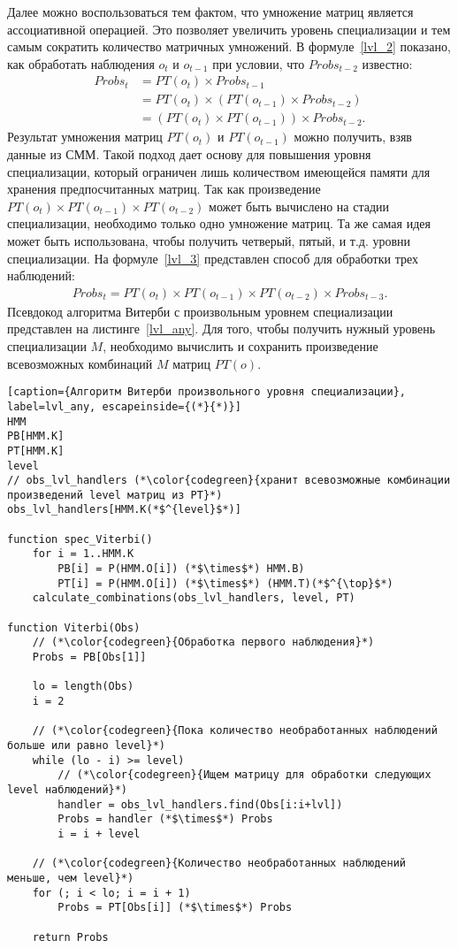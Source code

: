 Далее можно воспользоваться тем фактом, что умножение матриц 
является ассоциативной операцией.
Это позволяет увеличить уровень специализации и тем самым 
сократить количество матричных умножений.
В формуле~\ref{lvl_2} показано, как обработать наблюдения $o_{t}$ и $o_{t-1}$ при условии, 
что $Probs_{t-2}$ известно:
\begin{align}
  \mathit{Probs}_{t} &= \mathit{PT}(\mathit{o}_{t}) \times \mathit{Probs}_{t-1}\nonumber\\
  &= \mathit{PT}(\mathit{o}_{t}) \times (\mathit{PT}(\mathit{o}_{t-1}) \times \mathit{Probs}_{t-2}) \nonumber\\
  & =(\mathit{PT}(\mathit{o}_{t}) \times \mathit{PT}(\mathit{o}_{t-1})) \times \mathit{Probs}_{t-2}.
\label{lvl_2}
\end{align}
Результат умножения матриц $PT(o_t)$ и $PT(o_{t-1})$
можно получить, взяв данные из СММ.
Такой подход дает основу для повышения уровня специализации, 
который ограничен лишь количеством имеющейся памяти для хранения предпосчитанных матриц.
Так как произведение $\mathit{PT}(o_t) \times \mathit{PT}(o_{t-1}) \times \mathit{PT}(o_{t-2})$
может быть вычислено на стадии специализации, необходимо 
только одно умножение матриц.
Та же самая идея может быть использована, чтобы получить 
четверый, пятый, и т.д. уровни специализации.
На формуле~\ref{lvl_3} представлен способ для обработки трех 
наблюдений:
\begin{align}
  \mathit{Probs}_{t} = \mathit{PT}(o_t) \times \mathit{PT}(o_{t-1}) \times \mathit{PT}(o_{t-2}) \times \mathit{Probs}_{t - 3}.
\label{lvl_3}
\end{align}
Псевдокод алгоритма Витерби с произвольным уровнем 
специализации представлен на листинге~\ref{lvl_any}.
Для того, чтобы получить нужный уровень специализации $M$, 
необходимо вычислить и сохранить произведение всевозможных 
комбинаций $M$ матриц $PT(o)$.
\begin{lstlisting}[caption={Алгоритм Витерби произвольного уровня специализации}, label=lvl_any, escapeinside={(*}{*)}]
HMM
PB[HMM.K]
PT[HMM.K]
level
// obs_lvl_handlers (*\color{codegreen}{хранит всевозможные комбинации произведений level матриц из PT}*)
obs_lvl_handlers[HMM.K(*$^{level}$*)]

function spec_Viterbi()
	for i = 1..HMM.K
		PB[i] = P(HMM.O[i]) (*$\times$*) HMM.B)
		PT[i] = P(HMM.O[i]) (*$\times$*) (HMM.T)(*$^{\top}$*)
	calculate_combinations(obs_lvl_handlers, level, PT)

function Viterbi(Obs)
	// (*\color{codegreen}{Обработка первого наблюдения}*)
	Probs = PB[Obs[1]]

	lo = length(Obs)
	i = 2

	// (*\color{codegreen}{Пока количество необработанных наблюдений больше или равно level}*)
	while (lo - i) >= level)
		// (*\color{codegreen}{Ищем матрицу для обработки следующих level наблюдений}*)
		handler = obs_lvl_handlers.find(Obs[i:i+lvl])
		Probs = handler (*$\times$*) Probs
		i = i + level
	
	// (*\color{codegreen}{Количество необработанных наблюдений меньше, чем level}*)
	for (; i < lo; i = i + 1)
		Probs = PT[Obs[i]] (*$\times$*) Probs

	return Probs
\end{lstlisting}
